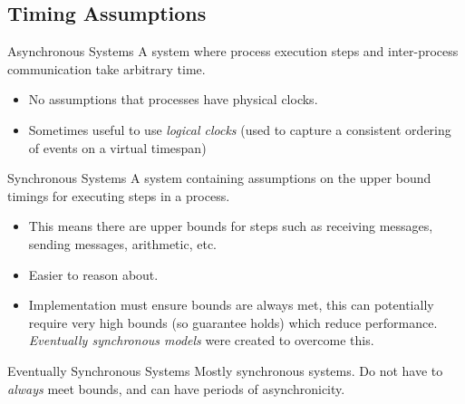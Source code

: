 \subsection{Timing Assumptions}
\begin{definitionbox}{Asynchronous Systems}
    A system where process execution steps and inter-process communication take arbitrary time.
    \begin{itemize}
        \item No assumptions that processes have physical clocks.
        \item Sometimes useful to use \textit{logical clocks} (used to capture a consistent ordering of events on a virtual timespan)
    \end{itemize}
\end{definitionbox}

\begin{definitionbox}{Synchronous Systems}
    A system containing assumptions on the upper bound timings for executing steps in a process.
    \begin{itemize}
        \item This means there are upper bounds for steps such as receiving messages, sending messages, arithmetic, etc.
        \item Easier to reason about.
        \item Implementation must ensure bounds are always met, this can potentially require very high bounds (so guarantee holds) which reduce performance. \textit{Eventually synchronous models} were created to overcome this.
    \end{itemize}
\end{definitionbox}

\begin{definitionbox}{Eventually Synchronous Systems}
    Mostly synchronous systems. Do not have to \textit{always} meet bounds, and can have periods of asynchronicity.
\end{definitionbox}

